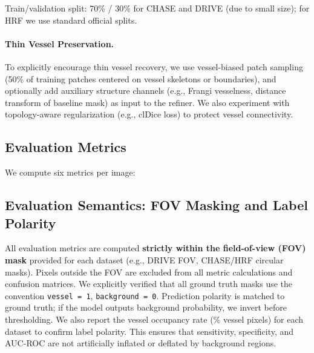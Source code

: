 \documentclass[11pt]{article}
\begin{document}
Train/validation split: 70\% / 30\% for CHASE and DRIVE (due to small size); for HRF we use standard official splits.

\paragraph{Thin Vessel Preservation.}
To explicitly encourage thin vessel recovery, we use vessel-biased patch sampling (50\% of training patches centered on vessel skeletons or boundaries), and optionally add auxiliary structure channels (e.g., Frangi vesselness, distance transform of baseline mask) as input to the refiner. We also experiment with topology-aware regularization (e.g., clDice loss) to protect vessel connectivity.

\subsection{Evaluation Metrics}

We compute six metrics per image:

\subsection{Evaluation Semantics: FOV Masking and Label Polarity}
\label{sec:evaluation-semantics}
All evaluation metrics are computed \textbf{strictly within the field-of-view (FOV) mask} provided for each dataset (e.g., DRIVE FOV, CHASE/HRF circular masks). Pixels outside the FOV are excluded from all metric calculations and confusion matrices. We explicitly verified that all ground truth masks use the convention \texttt{vessel = 1}, \texttt{background = 0}. Prediction polarity is matched to ground truth; if the model outputs background probability, we invert before thresholding. We also report the vessel occupancy rate (\% vessel pixels) for each dataset to confirm label polarity. This ensures that sensitivity, specificity, and AUC-ROC are not artificially inflated or deflated by background regions.
\end{document}
